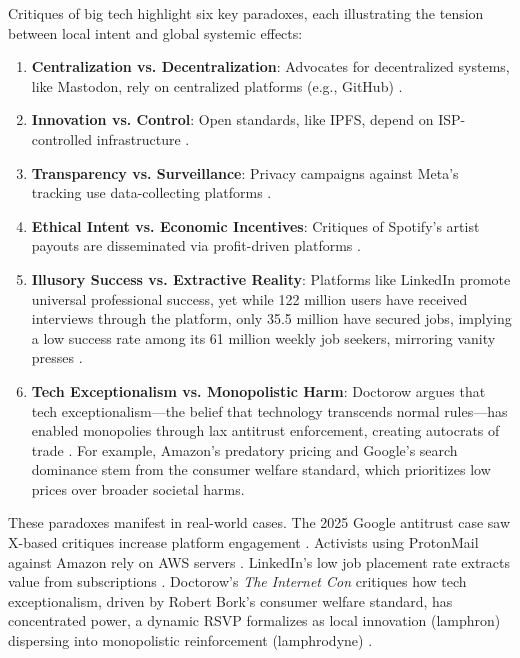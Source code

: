 \documentclass{article}
\begin{document}
Critiques of big tech highlight six key paradoxes, each illustrating the tension between local intent and global systemic effects:

\begin{enumerate}
    \item \textbf{Centralization vs. Decentralization}: Advocates for decentralized systems, like Mastodon, rely on centralized platforms (e.g., GitHub) \cite{mastodon2025}.
    \item \textbf{Innovation vs. Control}: Open standards, like IPFS, depend on ISP-controlled infrastructure \cite{ipfs2025}.
    \item \textbf{Transparency vs. Surveillance}: Privacy campaigns against Meta’s tracking use data-collecting platforms \cite{meta2025}.
    \item \textbf{Ethical Intent vs. Economic Incentives}: Critiques of Spotify’s artist payouts are disseminated via profit-driven platforms \cite{spotify2025}.
    \item \textbf{Illusory Success vs. Extractive Reality}: Platforms like LinkedIn promote universal professional success, yet while 122 million users have received interviews through the platform, only 35.5 million have secured jobs, implying a low success rate among its 61 million weekly job seekers, mirroring vanity presses \cite{kinsta2025linkedin,ghedau2025linkedin,amos2024}.
    \item \textbf{Tech Exceptionalism vs. Monopolistic Harm}: Doctorow argues that tech exceptionalism—the belief that technology transcends normal rules—has enabled monopolies through lax antitrust enforcement, creating autocrats of trade \cite{doctorow2023internetcon}. For example, Amazon’s predatory pricing and Google’s search dominance stem from the consumer welfare standard, which prioritizes low prices over broader societal harms.
\end{enumerate}

These paradoxes manifest in real-world cases. The 2025 Google antitrust case saw X-based critiques increase platform engagement \cite{doj2025}. Activists using ProtonMail against Amazon rely on AWS servers \cite{amazon2025}. LinkedIn’s low job placement rate extracts value from subscriptions \cite{kinsta2025linkedin}. Doctorow’s \textit{The Internet Con} critiques how tech exceptionalism, driven by Robert Bork’s consumer welfare standard, has concentrated power, a dynamic RSVP formalizes as local innovation (lamphron) dispersing into monopolistic reinforcement (lamphrodyne) \cite{doctorow2023internetcon}.
\end{document}
